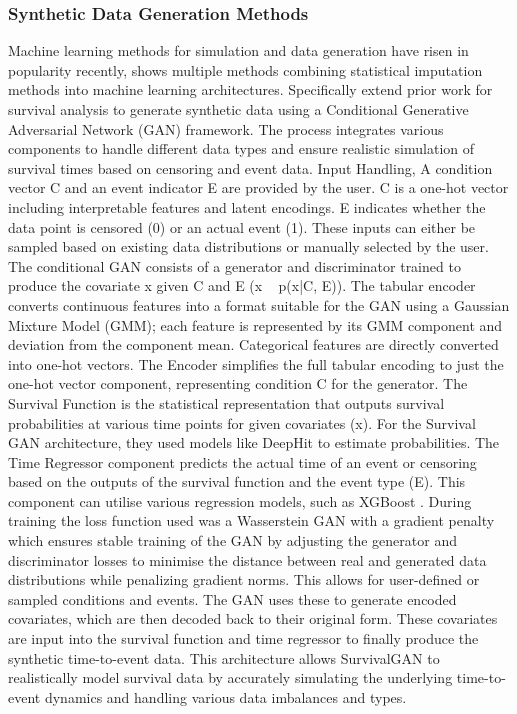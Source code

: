 \subsubsection{Synthetic Data Generation Methods}
Machine learning methods for simulation and data generation have risen in popularity recently, \parencite{norcliffe_survivalgan_2023} shows multiple methods combining statistical imputation methods into machine learning architectures. Specifically \parencite{norcliffe_survivalgan_2023} extend prior work for survival analysis to generate synthetic data using a Conditional Generative Adversarial Network (GAN) framework. The process integrates various components to handle different data types and ensure realistic simulation of survival times based on censoring and event data. Input Handling, A condition vector C and an event indicator E are provided by the user. C is a one-hot vector including interpretable features and latent encodings. E indicates whether the data point is censored (0) or an actual event (1). These inputs can either be sampled based on existing data distributions or manually selected by the user. The conditional GAN consists of a generator and discriminator trained to produce the covariate x given C and E (x ~ p(x|C, E)). The tabular encoder converts continuous features into a format suitable for the GAN using a Gaussian Mixture Model (GMM)\parencite{norcliffe_survivalgan_2023}; each feature is represented by its GMM component and deviation from the component mean. Categorical features are directly converted into one-hot vectors. The Encoder simplifies the full tabular encoding to just the one-hot vector component, representing condition C for the generator. The Survival Function is the statistical representation that outputs survival probabilities at various time points for given covariates (x). For the Survival GAN architecture, they used models like DeepHit \parencite{norcliffe_survivalgan_2023} to estimate probabilities. The Time Regressor component predicts the actual time of an event or censoring based on the outputs of the survival function and the event type (E). This component can utilise various regression models, such as XGBoost \parencite{norcliffe_survivalgan_2023}. During training the loss function used was a Wasserstein GAN \parencite{norcliffe_survivalgan_2023} with a gradient penalty which ensures stable training of the GAN by adjusting the generator and discriminator losses to minimise the distance between real and generated data distributions while penalizing gradient norms. This allows for user-defined or sampled conditions and events. The GAN uses these to generate encoded covariates, which are then decoded back to their original form. These covariates are input into the survival function and time regressor to finally produce the synthetic time-to-event data. This architecture allows SurvivalGAN to realistically model survival data by accurately simulating the underlying time-to-event dynamics and handling various data imbalances and types.

